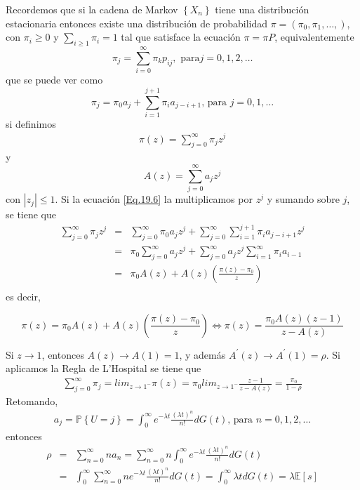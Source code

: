 \documentclass{article}
\newcommand{\esp}{\mathbb{E}}
\newcommand{\prob}{\mathbb{P}}
\begin{document}
Recordemos que si la cadena de Markov $\left\{X_{n}\right\}$ tiene una distribuci\'on estacionaria entonces existe una distribuci\'on de probabilidad $\pi=\left(\pi_{0},\pi_{1},\ldots,\right)$, con $\pi_{i}\geq0$ y $\sum_{i\geq1}\pi_{i}=1$ tal que satisface la
ecuaci\'on $\pi=\pi P$, equivalentemente
\begin{equation}\label{Eq.18.9}
\pi_{j}=\sum_{i=0}^{\infty}\pi_{k}p_{ij},\textrm{ para
}j=0,1,2,\ldots
\end{equation}
que se puede ver como
\begin{equation}\label{Eq.19.6}
\pi_{j}=\pi_{0}a_{j}+\sum_{i=1}^{j+1}\pi_{i}a_{j-i+1}\textrm{,
para }j=0,1,\ldots
\end{equation}
si definimos
\begin{eqnarray}
\pi\left(z\right)=\sum_{j=0}^{\infty}\pi_{j}z^{j}
\end{eqnarray}
y 
\begin{equation}
A\left(z\right)=\sum_{j=0}^{\infty}a_{j}z^{j}
\end{equation}
con $|z_{j}|\leq1$. Si la ecuaci\'on \ref{Eq.19.6} la multiplicamos por $z^{j}$ y sumando sobre $j$, se tiene que
\begin{eqnarray*}
\sum_{j=0}^{\infty}\pi_{j}z^{j}&=&\sum_{j=0}^{\infty}\pi_{0}a_{j}z^{j}+\sum_{j=0}^{\infty}\sum_{i=1}^{j+1}\pi_{i}a_{j-i+1}z^{j}\\
&=&\pi_{0}\sum_{j=0}^{\infty}a_{j}z^{j}+\sum_{j=0}^{\infty}a_{j}z^{j}\sum_{i=1}^{\infty}\pi_{i}a_{i-1}\\
&=&\pi_{0}A\left(z\right)+A\left(z\right)\left(\frac{\pi\left(z\right)-\pi_{0}}{z}\right)\\
\end{eqnarray*}
es decir,

\begin{equation}
\pi\left(z\right)=\pi_{0}A\left(z\right)+A\left(z\right)\left(\frac{\pi\left(z\right)-\pi_{0}}{z}\right)\Leftrightarrow\pi\left(z\right)=\frac{\pi_{0}A\left(z\right)\left(z-1\right)}{z-A\left(z\right)}
\end{equation}

Si $z\rightarrow1$, entonces $A\left(z\right)\rightarrow A\left(1\right)=1$, y adem\'as $A^{'}\left(z\right)\rightarrow A^{'}\left(1\right)=\rho$. Si aplicamos la Regla de L'Hospital se tiene que
\begin{eqnarray*}
\sum_{j=0}^{\infty}\pi_{j}=lim_{z\rightarrow1^{-}}\pi\left(z\right)=\pi_{0}lim_{z\rightarrow1^{-}}\frac{z-1}{z-A\left(z\right)}=\frac{\pi_{0}}{1-\rho}
\end{eqnarray*}
Retomando,
\begin{eqnarray*}
a_{j}=\prob\left\{U=j\right\}=\int_{0}^{\infty}e^{-\lambda
t}\frac{\left(\lambda t\right)^{n}}{n!}dG\left(t\right)\textrm{,
para }n=0,1,2,\ldots
\end{eqnarray*}
entonces
\begin{eqnarray*}
\rho&=&\sum_{n=0}^{\infty}na_{n}=\sum_{n=0}^{\infty}n\int_{0}^{\infty}e^{-\lambda t}\frac{\left(\lambda t\right)^{n}}{n!}dG\left(t\right)\\
&=&\int_{0}^{\infty}\sum_{n=0}^{\infty}ne^{-\lambda
t}\frac{\left(\lambda
t\right)^{n}}{n!}dG\left(t\right)=\int_{0}^{\infty}\lambda
tdG\left(t\right)=\lambda\esp\left[s\right]
\end{eqnarray*}
\end{document}

